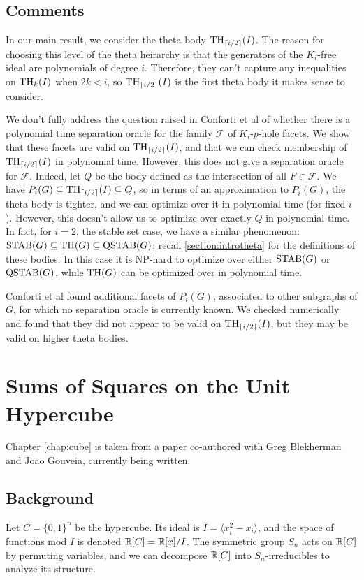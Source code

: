 \subsection{Comments}
In our main result, we consider the theta body $\textup{TH}_{\lceil i/2 \rceil}(I)$. 
The reason for choosing this level of the theta heirarchy is that the generators of the $K_i$-free ideal are polynomials of degree $i$.
Therefore, they can't capture any inequalities on $\textup{TH}_k(I)$ when $2k < i$, so $\textup{TH}_{\lceil i/2 \rceil}(I)$ is the first theta body it makes sense to consider.

We don't fully address the question raised in Conforti et al \cite{conforti} of whether there is a polynomial time separation oracle for the family $\mathcal{F}$ of $K_i$-$p$-hole facets.
We show that these facets are valid on $\textup{TH}_{\lceil i/2\rceil}(I)$, and that we can check membership of $\textup{TH}_{\lceil i/2 \rceil}(I)$ in polynomial time. 
However, this does not give a separation oracle for $\mathcal{F}$.
Indeed, let $Q$ be the body defined as the intersection of all $F \in \mathcal{F}$.
We have $P_i(G) \subseteq \textup{TH}_{\lceil i/2\rceil}(I) \subseteq Q$, so in terms of an approximation to $P_i(G)$, the theta body is tighter, and we can optimize over it in polynomial time (for fixed $i$).
However, this doesn't allow us to optimize over exactly $Q$ in polynomial time.
In fact, for $i=2$, the stable set case, we have a similar phenomenon: $\textup{STAB}(G) \subseteq \textup{TH}(G) \subseteq \textup{QSTAB}(G)$; recall \ref{section:introtheta} for the definitions of these bodies.
In this case it is NP-hard to optimize over either $\textup{STAB}(G)$ or $\textup{QSTAB}(G)$, while $\textup{TH}(G)$ can be optimized over in polynomial time.


Conforti et al \cite{conforti} found additional facets of $P_i(G)$, associated to other subgraphs of $G$, for which no separation oracle is currently known. 
We checked numerically and found that they did not appear to be valid on $\textup{TH}_{\lceil i/2\rceil}(I)$, but they may be valid on higher theta bodies.

\section{Sums of Squares on the Unit Hypercube}
Chapter \ref{chap:cube} is taken from a paper co-authored with Greg Blekherman and Joao Gouveia, currently being written.

\subsection{Background}
Let $C = \{0,1\}^n$ be the hypercube.
Its ideal is $I = \langle x_i^2 - x_i \rangle$, and the space of functions mod $I$ is denoted $\mathbb{R}[C] = \mathbb{R}[x]/I$.
The symmetric group $S_n$ acts on $\mathbb{R}[C]$ by permuting variables, and we can decompose $\mathbb{R}[C]$ into $S_n$-irreducibles to analyze its structure.

